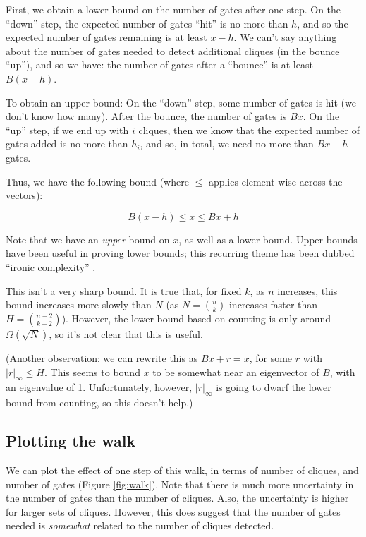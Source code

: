 \documentclass[12pt]{article}
\theoremstyle{definition}
\begin{document}
First, we obtain a lower bound on the number of gates after one step.
On the ``down'' step, the expected number of gates ``hit'' is no more than $h$,
and so the expected number of gates remaining is at least $x - h$.
We can't say anything about the number of gates needed to detect additional cliques (in the bounce ``up''), and so we have:
the number of gates after a ``bounce'' is at least $B(x-h)$.

To obtain an upper bound: On the ``down'' step, some number of gates is hit (we don't know how many).
After the bounce, the number of gates is $Bx$.
On the ``up'' step,
if we end up with $i$ cliques, then we know that the expected number of gates added is no more than $h_i$,
and so, in total, we need no more than $Bx+h$ gates.

Thus, we have the following bound (where $\le$ applies element-wise across the vectors):

\begin{equation}
\label{eq:stepBound}
B(x - h) \le x \le Bx + h
\end{equation}

Note that we have an {\em upper} bound on $x$, as well
as a lower bound. Upper bounds have been useful in proving lower bounds;
this recurring theme has been dubbed ``ironic complexity''
\cite{aaronson_pnp}.

This isn't a very sharp bound.
It is true that, for fixed $k$, as $n$ increases, this bound increases more slowly than $N$ (as $N = {n \choose k}$ increases faster than $H = {{n-2} \choose {k-2}}$). However, the lower bound based on
counting is only around $\Omega(\sqrt{N})$, so it's not clear that this is useful.

(Another observation: we can rewrite this as $Bx + r = x$,
for some $r$ with $|r|_\infty \le H$. This seems to bound $x$ to be somewhat near
an eigenvector of $B$, with an eigenvalue of 1. Unfortunately, however,
$|r|_\infty$ is going to dwarf the lower bound
from counting, so this doesn't help.)

\subsection{Plotting the walk}

We can plot the effect of one step of this walk, in terms of number of cliques, and number of gates (Figure \ref{fig:walk}).
Note that there is much more uncertainty in the number of gates than the number of cliques. Also, the
uncertainty is higher
for larger sets of cliques.  However, this does suggest that the
number of gates needed is {\em somewhat} related to the number of cliques detected.
\end{document}
